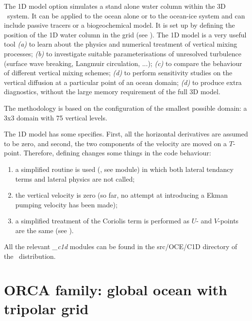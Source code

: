 \documentclass[../main/NEMO_manual]{subfiles}
\begin{document}
The 1D model option simulates a stand alone water column within the 3D \NEMO\ system.
It can be applied to the ocean alone or to the ocean-ice system and can include passive tracers or a biogeochemical model.
It is set up by defining the position of the 1D water column in the grid
(see ).
The 1D model is a very useful tool
\textit{(a)} to learn about the physics and numerical treatment of vertical mixing processes;
\textit{(b)} to investigate suitable parameterisations of unresolved turbulence
(surface wave breaking, Langmuir circulation, ...);
\textit{(c)} to compare the behaviour of different vertical mixing schemes;
\textit{(d)} to perform sensitivity studies on the vertical diffusion at a particular point of an ocean domain;
\textit{(d)} to produce extra diagnostics, without the large memory requirement of the full 3D model.

The methodology is based on the configuration of the smallest possible domain:
a 3x3 domain with 75 vertical levels.

The 1D model has some specifies. First, all the horizontal derivatives are assumed to be zero,
and second, the two components of the velocity are moved on a $T$-point.
Therefore, defining  changes some things in the code behaviour:
\begin{enumerate}
\item a simplified  routine is used (, see  module) in which
  both lateral tendancy terms and lateral physics are not called;
\item the vertical velocity is zero
  (so far, no attempt at introducing a Ekman pumping velocity has been made);
\item a simplified treatment of the Coriolis term is performed as $U$- and $V$-points are the same
  (see ).
\end{enumerate}
All the relevant \textit{\_c1d} modules can be found in the src/OCE/C1D directory of
the \NEMO\ distribution.


\section{ORCA family: global ocean with tripolar grid}
\label{sec:CFGS_orca}
\end{document}
